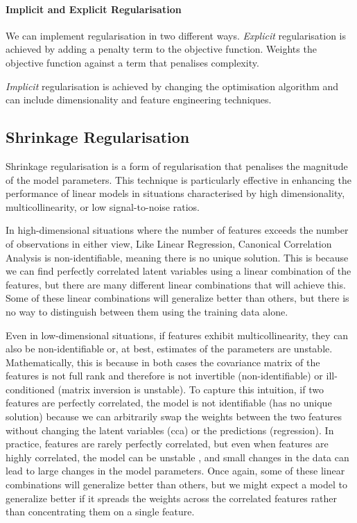 \paragraph{Implicit and Explicit Regularisation}

We can implement regularisation in two different ways.
\textit{Explicit} regularisation is achieved by adding a penalty term to the objective function. Weights the objective function against a term that penalises complexity.

\textit{Implicit} regularisation is achieved by changing the optimisation algorithm and can include dimensionality and feature engineering techniques.

\subsection{Shrinkage Regularisation}

Shrinkage regularisation is a form of regularisation that penalises the magnitude of the model parameters.
This technique is particularly effective in enhancing the performance of linear models in situations characterised by high dimensionality, multicollinearity, or low signal-to-noise ratios.

In high-dimensional situations where the number of features exceeds the number of observations in either view, Like Linear Regression, Canonical Correlation Analysis is non-identifiable, meaning there is no unique solution.
This is because we can find perfectly correlated latent variables using a linear combination of the features, but there are many different linear combinations that will achieve this.
Some of these linear combinations will generalize better than others, but there is no way to distinguish between them using the training data alone.

Even in low-dimensional situations, if features exhibit multicollinearity, they can also be non-identifiable or, at best, estimates of the parameters are unstable.
Mathematically, this is because in both cases the covariance matrix of the features is not full rank and therefore is not invertible (non-identifiable) or ill-conditioned (matrix inversion is unstable).
To capture this intuition, if two features are perfectly correlated, the model is not identifiable (has no unique solution) because we can arbitrarily swap the \gls{weights} between the two features without changing the latent variables (\acrshort{cca}) or the predictions (regression).
In practice, features are rarely perfectly correlated, but even when features are highly correlated, the model can be unstable \citep{mihalik2020multiple}, and small changes in the data can lead to large changes in the model parameters.
Once again, some of these linear combinations will generalize better than others, but we might expect a model to generalize better if it spreads the \gls{weights} across the correlated features rather than concentrating them on a single feature.

